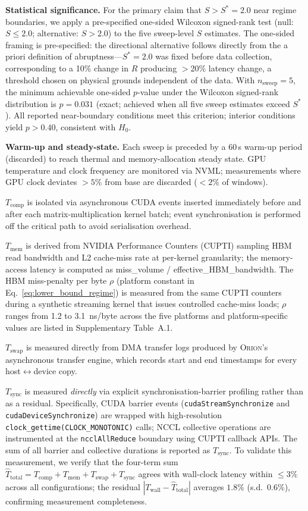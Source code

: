 \textbf{Statistical significance.}
For the primary claim that $S > S^* = 2.0$ near regime boundaries, we apply
a pre-specified one-sided Wilcoxon signed-rank test (null: $S \leq 2.0$;
alternative: $S > 2.0$) to the five sweep-level $S$ estimates.
The one-sided framing is pre-specified: the directional alternative follows
directly from the a priori definition of abruptness---$S^* = 2.0$ was fixed
before data collection, corresponding to a 10\% change in $R$ producing
$>$20\% latency change, a threshold chosen on physical grounds independent
of the data.
With $n_{\mathrm{sweep}} = 5$, the minimum achievable one-sided $p$-value
under the Wilcoxon signed-rank distribution is $p = 0.031$ (exact; achieved
when all five sweep estimates exceed $S^*$).
All reported near-boundary conditions meet this criterion; interior conditions
yield $p > 0.40$, consistent with $H_0$.

\textbf{Warm-up and steady-state.}
Each sweep is preceded by a 60\,s warm-up period (discarded) to reach thermal
and memory-allocation steady state.
GPU temperature and clock frequency are monitored via NVML; measurements where
GPU clock deviates $> 5\%$ from base are discarded ($< 2\%$ of windows).

\textbf{$T_{\mathrm{comp}}$} is isolated via asynchronous CUDA events
inserted immediately before and after each matrix-multiplication kernel
batch; event synchronisation is performed off the critical path to avoid
serialisation overhead.

\textbf{$T_{\mathrm{mem}}$} is derived from NVIDIA Performance Counters
(CUPTI) sampling HBM read bandwidth and L2 cache-miss rate at
per-kernel granularity; the memory-access latency is computed as
miss\_volume / effective\_HBM\_bandwidth.
The HBM miss-penalty per byte $\rho$ (platform constant in
Eq.~\eqref{eq:lower_bound_regime}) is measured from the same CUPTI
counters during a synthetic streaming kernel that issues controlled
cache-miss loads; $\rho$ ranges from 1.2 to 3.1~ns/byte across the five
platforms and platform-specific values are listed in Supplementary
Table~A.1.

\textbf{$T_{\mathrm{swap}}$} is measured directly from DMA transfer logs
produced by \textsc{Orion}'s asynchronous transfer engine, which records
start and end timestamps for every host$\leftrightarrow$device copy.

\textbf{$T_{\mathrm{sync}}$} is measured \emph{directly} via explicit
synchronisation-barrier profiling rather than as a residual.
Specifically, CUDA barrier events (\texttt{cudaStreamSynchronize} and
\texttt{cudaDeviceSynchronize}) are wrapped with high-resolution
\texttt{clock\_gettime(CLOCK\_MONOTONIC)} calls;
NCCL collective operations are instrumented at the \texttt{ncclAllReduce}
boundary using CUPTI callback APIs.
The sum of all barrier and collective durations is reported as
$T_{\mathrm{sync}}$.
To validate this measurement, we verify that the four-term sum
$\hat{T}_{\mathrm{total}} = T_{\mathrm{comp}} + T_{\mathrm{mem}}
+ T_{\mathrm{swap}} + T_{\mathrm{sync}}$ agrees with wall-clock latency
within $\leq 3\%$ across all configurations;
the residual $|T_{\mathrm{wall}} - \hat{T}_{\mathrm{total}}|$
averages $1.8\%$ (s.d.\ $0.6\%$), confirming measurement completeness.

